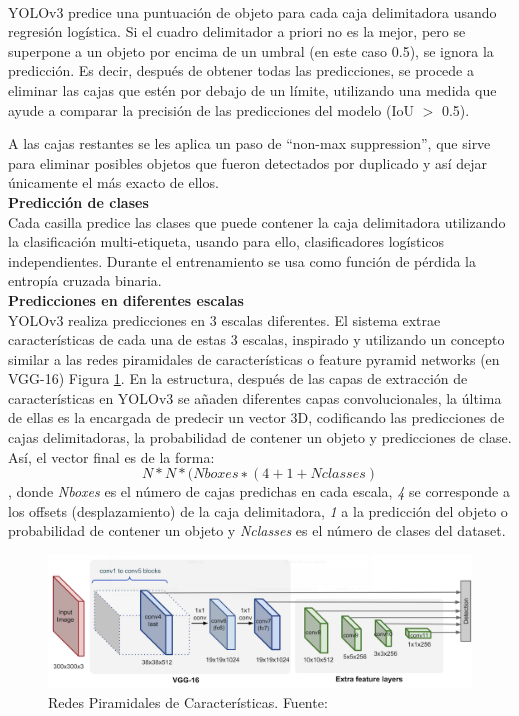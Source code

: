 \\ \break
YOLOv3 predice una puntuación de objeto para cada caja delimitadora usando regresión logística. Si el cuadro delimitador a priori no es la mejor, pero se superpone a un objeto por encima de un umbral (en este caso 0.5), se ignora la predicción. Es decir, después de obtener todas las predicciones, se procede a eliminar las cajas que estén por debajo de un límite, utilizando una medida que ayude a comparar la precisión de las predicciones del modelo (IoU $>$ 0.5).

A las cajas restantes se les aplica un paso de “non-max suppression”, que sirve para eliminar posibles objetos que fueron detectados por duplicado y así dejar únicamente el más exacto de ellos. \\


\textbf{Predicción de clases} \\

Cada casilla predice las clases que puede contener la caja delimitadora utilizando la clasificación multi-etiqueta, usando para ello, clasificadores logísticos independientes. Durante el entrenamiento se usa como función de pérdida la entropía cruzada binaria. \\


\textbf{Predicciones en diferentes escalas} \\

YOLOv3 realiza predicciones en 3 escalas diferentes. El sistema extrae características de cada una de estas 3 escalas, inspirado y utilizando un concepto similar a las redes piramidales de características o feature pyramid networks \cite{featurepiramid} (en VGG-16) Figura \ref{fig:vgg-16}. En la estructura, después de las capas de extracción de características en YOLOv3 se añaden diferentes capas convolucionales, la última de ellas es la encargada de predecir un vector 3D, codificando las predicciones de cajas delimitadoras, la probabilidad de contener un objeto y predicciones de clase. Así, el vector final es de la forma: \[N * N * (Nboxes ∗ (4 + 1 + Nclasses)\], donde \textit{Nboxes} es el número de cajas predichas en cada escala, \textit{4} se corresponde a los offsets (desplazamiento) de la caja delimitadora, \textit{1} a la predicción del objeto o probabilidad de contener un objeto y \textit{Nclasses} es el número de clases del dataset.

\begin{figure}
    \centering
    \includegraphics[width=1\textwidth]{img/VGG-16-NetPriamidal.png}
    \caption{Redes Piramidales de Características. Fuente: \cite{10.1007/978-981-19-0011-2_34}}
    \label{fig:vgg-16}
\end{figure}

